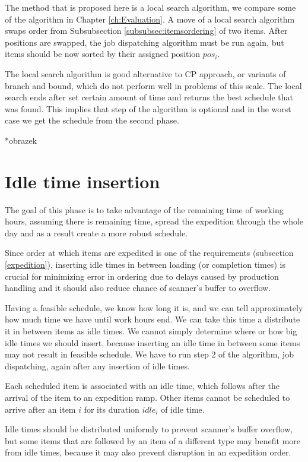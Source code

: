 \documentclass{ctuthesis}
\begin{document}
The method that is proposed here is a local search algorithm, we compare some of the algorithm in Chapter \ref{ch:Evaluation}. A move of a local search algorithm swaps order from Subsubsection \ref{subsubsec:itemsordering} of two items. After positions are swapped, the job dispatching algorithm must be run again, but items should be now sorted by their assigned position $pos_i$.

The local search algorithm is good alternative to CP approach, or variants of branch and bound, which do not perform well in problems of this scale. The local search ends after set certain amount of time and returns the best schedule that was found. This implies that step of the algorithm is optional and in the worst case we get the schedule from the second phase.

*obrazek

\section{Idle time insertion}

The goal of this phase is to take advantage of the remaining time of working hours, assuming there is remaining time, spread the expedition through the whole day and as a result create a more robust schedule. 

Since order at which items are expedited is one of the requirements (subsection \ref{expedition}), inserting idle times in between loading (or completion times) is crucial for minimizing error in ordering due to delays caused by production handling and it should also reduce chance of scanner's buffer to overflow.

Having a feasible schedule, we know how long it is, and we can tell approximately how much time we have until work hours end. We can take this time a distribute it in between items as idle times. We cannot simply determine where or how big idle times we should insert, because inserting an idle time in between some items may not result in feasible schedule. We have to run step 2 of the algorithm, job dispatching, again after any insertion of idle times.

Each scheduled item is associated with an idle time, which follows after the arrival of the item to an expedition ramp. Other items cannot be scheduled to arrive after an item $i$ for its duration $idle_i$ of idle time.

Idle times should be distributed uniformly to prevent scanner's buffer overflow, but some items that are followed by an item of a different type may benefit more from idle times, because it may also prevent disruption in an expedition order.
\end{document}
